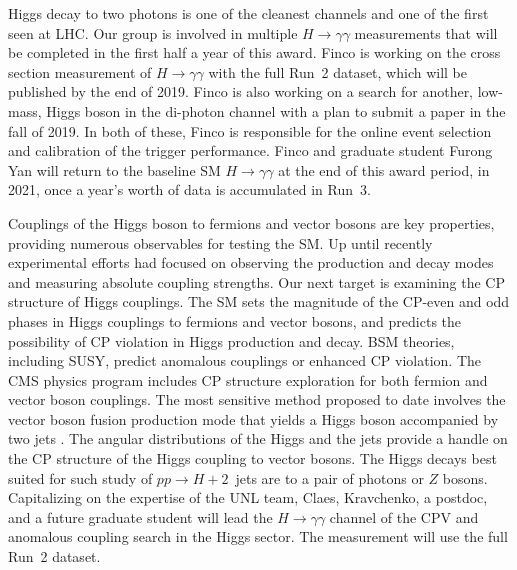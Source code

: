 Higgs decay to two photons is one of the cleanest channels and one of the first seen at LHC. Our group is involved in multiple $H\to\gamma\gamma$ measurements that will be completed in the first half a year of this award. Finco is working on the cross section measurement of  $H\to\gamma\gamma$ with the full Run~2 dataset, which will be published by the end of 2019. Finco is also working on a search for another, low-mass, Higgs boson in the di-photon channel with a plan to submit a paper in the fall of 2019. In both of these, Finco is responsible for the online event selection and calibration of the trigger performance. Finco and graduate student Furong Yan will return to the baseline SM $H\to\gamma\gamma$ at the end of this award period, in 2021, once a year's worth of data is accumulated in Run~3.

Couplings of the Higgs boson to fermions and vector bosons are key properties, providing numerous observables for testing the SM.  Up until recently experimental efforts had focused on observing the production and decay modes and measuring absolute coupling strengths. Our next target is examining the CP structure of Higgs couplings. The SM sets the magnitude of the CP-even and odd phases in Higgs couplings to fermions and vector bosons, and predicts the possibility of CP violation in Higgs production and decay. BSM theories, including SUSY, predict anomalous couplings or enhanced CP violation. The CMS physics program includes CP structure exploration for both fermion and vector boson couplings. The most sensitive method proposed to date involves the vector boson fusion production mode that yields a Higgs boson accompanied by two jets \cite{bib:H2jets}. The angular distributions of the Higgs and the jets provide a handle on the CP structure of the Higgs coupling to vector bosons. The Higgs decays best suited for such study of $pp\to H\!+\!2$~jets are to a pair of photons or $Z$ bosons. Capitalizing on the expertise of the UNL team, Claes, Kravchenko, a postdoc, and a future graduate student will lead the $H\to\gamma\gamma$ channel of the CPV and anomalous coupling search in the Higgs sector. The measurement will use the full Run~2 dataset.

